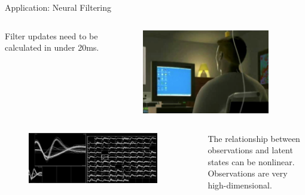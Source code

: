 \documentclass[aspectratio=169,19pt,xetex,handout]{beamer}
\begin{document}

\begin{frame}{Application: Neural Filtering}

\begin{columns}
\raggedleft Filter updates need to be calculated in under 20ms.
\begin{figure}
    \raggedright
    \includegraphics[width=0.9\textwidth]{bg_setup_2}
\end{figure}
\end{columns}

\begin{columns}
\begin{figure}[t]
    \includegraphics[width=0.9\textwidth]{waveforms}
        \raggedleft
\end{figure}
\raggedright
The relationship between observations and latent states can be nonlinear.  Observations are very high-dimensional.
\end{columns}

\end{frame}
\end{document}
